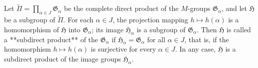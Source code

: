 Let $\tilde{\Pi} = \prod_{\alpha \in J} \mathfrak{G}_{\alpha}$ be the complete direct product of the $M$-groups $\mathfrak{G}_{\alpha}$, and let $\mathfrak{H}$ be a subgroup of $\tilde{\Pi}$. For each $\alpha \in J$, the projection mapping $h \mapsto h(\alpha)$ is a homomorphism of $\mathfrak{H}$ into $\mathfrak{G}_{\alpha}$; its image $\mathfrak{H}_{\alpha}$ is a subgroup of $\mathfrak{G}_{\alpha}$. Then $\mathfrak{H}$ is called a **subdirect product** of the $\mathfrak{G}_{\alpha}$ if $\mathfrak{H}_{\alpha} = \mathfrak{G}_{\alpha}$ for all $\alpha \in J$, that is, if the homomorphism $h \mapsto h(\alpha)$ is surjective for every $\alpha \in J$. In any case, $\mathfrak{H}$ is a subdirect product of the image groups $\mathfrak{H}_{\alpha}$.
